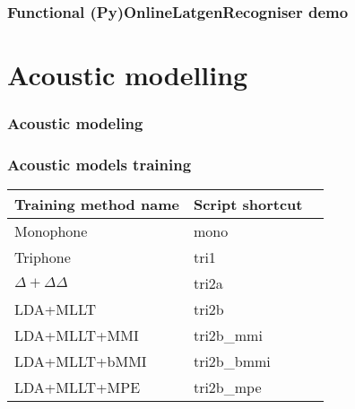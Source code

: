 \begin{frame}\frametitle{Functional (Py)OnlineLatgenRecogniser demo} 
    \begin{center}
        
    \end{center}
\end{frame}


\section{Acoustic modelling} %

\begin{frame}\frametitle{Acoustic modeling} 
    
\end{frame}

\begin{frame}\frametitle{Acoustic models training} 
    \begin{center}
        
        \small{\begin{tabular}{lll}
        \hline
        Training method name & Script shortcut \\
        \hline
        Monophone & mono \\
        Triphone  & tri1 \\
        $\Delta + \Delta\Delta$ & tri2a  \\
        LDA+MLLT & tri2b  \\
        LDA+MLLT+MMI & tri2b\_mmi \\
        LDA+MLLT+bMMI & tri2b\_bmmi \\
        LDA+MLLT+MPE & tri2b\_mpe \\
        \hline
        \end{tabular}}
    \end{center}
\end{frame}

